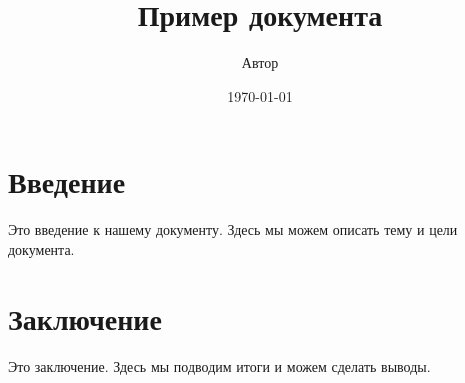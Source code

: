 \documentclass{article}
\title{Пример документа}
\author{Автор}
\date{\today}
\begin{document}
\maketitle

\section{Введение}
Это введение к нашему документу. Здесь мы можем описать тему и цели документа.

\section{Заключение}
Это заключение. Здесь мы подводим итоги и можем сделать выводы.
\end{document}
